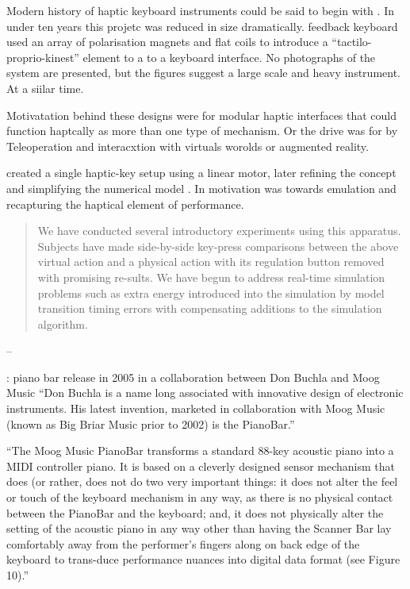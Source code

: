 Modern history of haptic keyboard instruments could be said to begin with 
\textcite{cadoz_synthese_1981}. In under ten years this projetc was reduced in size dramatically.
\textcite{cadoz_modular_1990} feedback keyboard used an array of polarisation magnets and flat coils to introduce a ``tactilo-proprio-kinest'' element to a to a keyboard interface. No photographs of the system are presented, but the figures suggest a large scale and heavy instrument. At a siilar time.

Motivatation behind these designs were for modular haptic interfaces \cite{cadoz_modular_1990} that could function haptcally as more than one type of mechanism. Or the drive was for  by Teleoperation and interacxtion with virtuals worolds or augmented reality.

\textcite{gillespie_dynamical_1992} created a single haptic-key setup using a linear motor, later refining the concept and simplifying the numerical model \cite{gillespie_virtual_1994}. 
In \textcite{gillespie_virtual_1994} motivation was towards emulation and recapturing the haptical element of performance.


\begin{quotation}
    We have conducted several introductory experiments using this apparatus. Subjects have made side-by-side key-press comparisons between the above virtual action and a physical action with its regulation button removed with promising re-sults. We have begun to address real-time simulation problems such as extra energy introduced into the simulation by model transition timing errors with compensating additions to the simulation algorithm.
\end{quotation}
-- \cite{gillespie_virtual_1994}


\cite{mowat_pianobar_2005}: piano bar release in 2005 in a collaboration between Don Buchla and Moog Music 
``Don Buchla is a name long associated with innovative design of electronic instruments. His latest invention, marketed in collaboration with Moog Music (known as Big Briar Music prior to 2002) is the PianoBar.''

``The Moog Music PianoBar transforms a standard 88-key acoustic piano into a MIDI controller piano. It is based on a cleverly designed sensor mechanism that does (or rather, does not do two very important things: it does not alter the feel or touch of the keyboard mechanism in any way, as there is no physical contact between the PianoBar and the keyboard; and, it does not physically alter the setting of the acoustic piano in any way other than having the Scanner Bar lay comfortably away from the performer's fingers along on back edge of the keyboard to trans-duce performance nuances into digital data format (see Figure 10).'' \cite{computer_products_2005}


